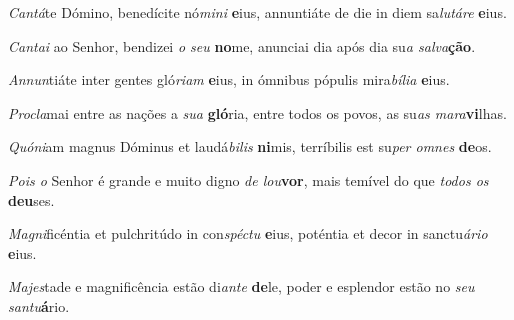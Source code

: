 \begin{greenumerate}
  \setcounter{enumi}{1}


  \item \textit{Cantá}te Dómino, benedícite nó\textit{mini} \textbf{e}ius, {\GreStar} annuntiáte de die in diem sa\textit{lutáre} \textbf{e}ius. 

  \switchcolumn\setcounter{enumi}{1}

  \item \textit{Cantai} ao Senhor, bendizei \textit{o seu} \textbf{no}me, {\GreStar} anunciai dia após dia su\textit{a salva}\textbf{ção}. 

  \switchcolumn*


  \item \textit{Annun}tiáte inter gentes gló\textit{riam} \textbf{e}ius, {\GreStar} in ómnibus pópulis mira\textit{bília} \textbf{e}ius. 


  \switchcolumn%

  \item \textit{Procla}mai entre as nações a \textit{sua} \textbf{gló}ria, {\GreStar} entre todos os povos, as su\textit{as mara}\textbf{vi}lhas. 

  \switchcolumn*


  \item \textit{Quóni}am magnus Dóminus et laudá\textit{bilis} \textbf{ni}mis, {\GreStar} terríbilis est su\textit{per omnes} \textbf{de}os. 
  \switchcolumn%

  \item \textit{Pois o} Senhor é grande e muito digno \textit{de lou}\textbf{vor}, {\GreStar} mais temível do que \textit{todos os} \textbf{deu}ses. 

  \switchcolumn*


  \item \textit{Magni}ficéntia et pulchritúdo in con\textit{spéctu} \textbf{e}ius, {\GreStar} poténtia et decor in sanctu\textit{ário} \textbf{e}ius. 

  \switchcolumn%

  \item \textit{Majes}tade e magnificência estão di\textit{ante} \textbf{de}le, {\GreStar} poder e esplendor estão no \textit{seu santu}\textbf{á}rio. 


\end{greenumerate}
